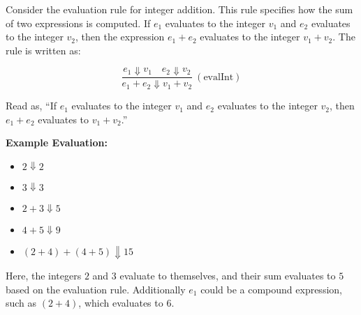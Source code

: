 \begin{Example}

    \label{ex:eval_integer_addition}
    Consider the evaluation rule for integer addition. This rule specifies how the sum of two expressions is computed. 
    If $e_1$ evaluates to the integer $v_1$ and $e_2$ evaluates to the integer $v_2$, 
    then the expression $e_1 + e_2$ evaluates to the integer $v_1 + v_2$. The rule is written as: \LARGE

    \[
    \frac{e_1 \Downarrow v_1 \quad e_2 \Downarrow v_2}{e_1 + e_2 \Downarrow v_1 + v_2} \ (\text{evalInt})
    \]

    \vspace{.5em}
    \normalsize
    \noindent
    Read as, ``If $e_1$ evaluates to the integer $v_1$ and $e_2$ evaluates to the integer $v_2$, 
    then $e_1 + e_2$ evaluates to $v_1 + v_2$.''

    \vspace{1em}
    \textbf{Example Evaluation:}
    \begin{itemize}
        \item $2 \Downarrow 2$
        \item $3 \Downarrow 3$
        \item $2 + 3 \Downarrow 5$
        \item $4 + 5 \Downarrow 9$
        \item $(2 + 4) + (4 + 5) \Downarrow 15$
    \end{itemize}

    \noindent
    Here, the integers $2$ and $3$ evaluate to themselves, and their sum evaluates to $5$ based on the evaluation rule.
    Additionally $e_1$ could be a compound expression, such as $(2 + 4)$, which evaluates to $6$.
\end{Example}

